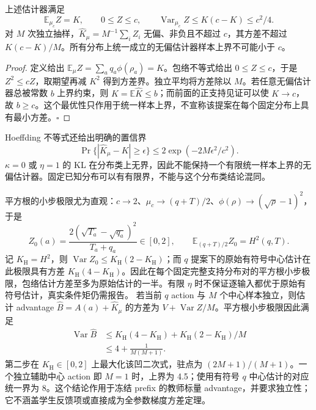 \documentclass[lang=cn,scheme=chinese,openany]{../book/elegantbook}
\newcommand{\E}{\mathbb E}
\newcommand{\Var}{\operatorname{Var}}
\begin{document}
\begin{theorem}[中心估计的最小统一样本上界]
\label{thm:center-bounded-estimator}
上述估计器满足
\begin{equation}
 \E_{\mu_c}Z=K,\qquad0\le Z\le c,\qquad
 \Var_{\mu_c}Z\le K(c-K)\le c^2/4.
\end{equation}
对 $M$ 次独立抽样，$\widehat K_\mu=M^{-1}\sum_iZ_i$ 无偏、非负且不超过 $c$，其方差不超过 $K(c-K)/M$。所有分布上统一成立的无偏估计器样本上界不可能小于 $c$。
\end{theorem}

\begin{proof}
定义给出 $\E_\mu Z=\sum_aq_a\phi(\rho_a)=K$。包络不等式给出 $0\le Z\le c$，于是 $Z^2\le cZ$，取期望再减 $K^2$ 得到方差界。独立平均将方差除以 $M$。若任意无偏估计器总被常数 $b$ 上界约束，则 $K=\E\widehat K\le b$；而前面的正支持见证可以使 $K\to c$，故 $b\ge c$。这个最优性只作用于统一样本上界，不宣称该提案在每个固定分布上具有最小方差。\hfill$\square$
\end{proof}

Hoeffding 不等式还给出明确的置信界
\begin{equation}
 \Pr\{ |\widehat K_\mu-K|\ge\epsilon\}
 \le2\exp(-2M\epsilon^2/c^2).
\end{equation}
$\kappa=0$ 或 $\eta=1$ 的 KL 在分布类上无界，因此不能保持一个有限统一样本上界的无偏估计器。固定已知分布可以有有限界，不能与这个分布类结论混同。

平方根的小步极限尤为直观：$c\to2$、$\mu_c\to(q+T)/2$、$\phi(\rho)\to(\sqrt\rho-1)^2$，于是
\begin{equation}
 Z_0(a)=\frac{2(\sqrt{T_a}-\sqrt{q_a})^2}{T_a+q_a}\in[0,2],
 \qquad\E_{(q+T)/2}Z_0=H^2(q,T).
\end{equation}
记 $K_{\mathrm H}=H^2$，则 $\Var Z_0\le K_{\mathrm H}(2-K_{\mathrm H})$；而 $q$ 提案下的原始有符号中心估计在此极限具有方差 $K_{\mathrm H}(4-K_{\mathrm H})$。因此在每个固定完整支持分布对的平方根小步极限，包络估计方差至多为原始估计的一半。有限 $\eta$ 时不保证逐输入都优于原始有符号估计，真实条件矩仍需报告。 若当前 $q$ action 与 $M$ 个中心样本独立，则估计 advantage $\widehat B=A(a)+\widehat K_\mu$ 的方差为 $V+\Var Z/M$。平方根小步极限因此满足
\begin{align}
 \Var\widehat B
 &\le K_{\mathrm H}(4-K_{\mathrm H})
    +K_{\mathrm H}(2-K_{\mathrm H})/M\\
 &\le4+\frac1{M(M+1)}.
\end{align}
第二步在 $K_{\mathrm H}\in[0,2]$ 上最大化该凹二次式，驻点为 $(2M+1)/(M+1)$。一个独立辅助中心 action 即 $M=1$ 时，上界为 4.5；使用有符号 $q$ 中心估计的对应统一界为 8。这个结论作用于冻结 prefix 的教师标量 advantage，并要求独立性；它不涵盖学生反馈项或直接成为全参数梯度方差定理。
\end{document}
